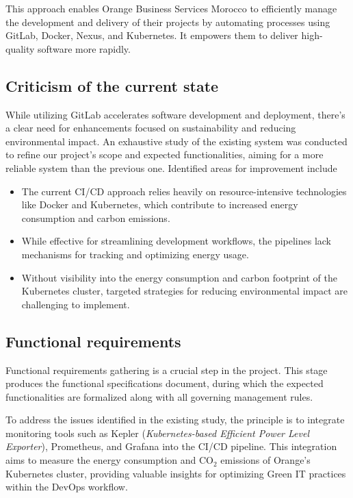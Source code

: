 This approach enables Orange Business Services Morocco to efficiently manage the development and delivery of their projects by automating processes using GitLab, Docker, Nexus, and Kubernetes. It empowers them to deliver high-quality software more rapidly.

\newpage
\subsection{Criticism of the current state}

While utilizing GitLab accelerates software development and deployment, there's a clear need for enhancements focused on sustainability and reducing environmental impact. An exhaustive study of the existing system was conducted to refine our project's scope and expected functionalities, aiming for a more reliable system than the previous one. Identified areas for improvement include

\begin{itemize}
  \item The current CI/CD approach relies heavily on resource-intensive technologies like Docker and Kubernetes, which contribute to increased energy consumption and carbon emissions.
  \item While effective for streamlining development workflows, the pipelines lack mechanisms for tracking and optimizing energy usage.
  \item Without visibility into the energy consumption and carbon footprint of the Kubernetes cluster, targeted strategies for reducing environmental impact are challenging to implement.
\end{itemize}

\subsection{Functional requirements}
Functional requirements gathering is a crucial step in the project. This stage produces the functional specifications document, during which the expected functionalities are formalized along with all governing management rules.

To address the issues identified in the existing study, the principle is to integrate monitoring tools such as Kepler (\emph{Kubernetes-based Efficient Power Level Exporter}), Prometheus, and Grafana into the CI/CD pipeline. This integration aims to measure the energy consumption and CO$_2$ emissions of Orange’s Kubernetes cluster, providing valuable insights for optimizing Green IT practices within the DevOps workflow.

